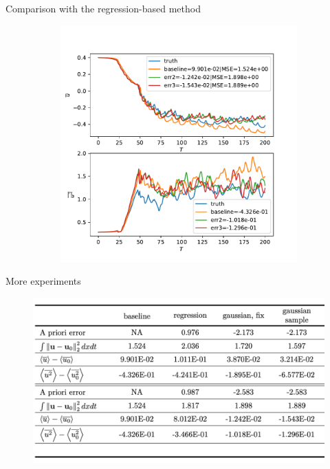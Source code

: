 \documentclass[paper slide]{beamer}
\begin{document}
\begin{frame}{Comparison with the regression-based method}
\begin{figure}[ht]
\begin{subfigure}[b]{0.48\textwidth}
				\includegraphics[width=\textwidth]
				{fig/ks_nu1_N1023n10_gaussian_cmp_stats.pdf}
		\end{subfigure}
		\label{fig:cmp_stats1}
	\end{figure}
\end{frame}


\begin{frame}{More experiments}
	\begin{figure}[ht] 
		\centering 
		\includegraphics[width=\textwidth]{fig/table.jpg} 
	\end{figure}
\end{frame}
\end{document}
